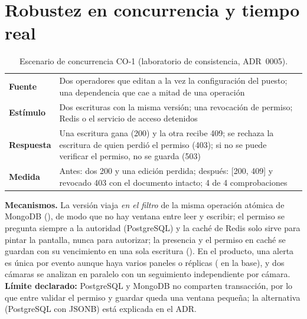 \section{Robustez en concurrencia y tiempo real}\label{sec:concurrencia}

\begin{table}[H]
\centering\small
\caption{Escenario de concurrencia CO-1 (laboratorio de consistencia, ADR~0005).}\label{tab:co1}
\begin{tabularx}{\textwidth}{lY}
\toprule
\textbf{Fuente} & Dos operadores que editan a la vez la configuración del puesto; una dependencia que cae a mitad de una operación \\
\textbf{Estímulo} & Dos escrituras con la misma versión; una revocación de permiso; Redis o el servicio de acceso detenidos \\
\textbf{Respuesta} & Una escritura gana (200) y la otra recibe 409; se rechaza la escritura de quien perdió el permiso (403); si no se puede verificar el permiso, no se guarda (503) \\
\textbf{Medida} & Antes: dos 200 y una edición perdida; después: [200, 409] y revocado 403 con el documento intacto; 4 de 4 comprobaciones \\
\bottomrule
\end{tabularx}
\end{table}

\textbf{Mecanismos.} La versión viaja \emph{en el filtro} de la misma operación atómica de MongoDB (), de modo que no hay
ventana entre leer y escribir; el permiso se pregunta siempre a la autoridad (PostgreSQL) y la caché de Redis solo sirve para pintar la
pantalla, nunca para autorizar; la presencia y el permiso en caché se guardan con su vencimiento en una sola escritura ().
En el producto, una alerta es única por evento aunque haya varios paneles o réplicas ( en la base), y dos cámaras se analizan en
paralelo con un seguimiento independiente por cámara. \textbf{Límite declarado:} PostgreSQL y MongoDB no comparten transacción, por lo que
entre validar el permiso y guardar queda una ventana pequeña; la alternativa (PostgreSQL con JSONB) está explicada en el ADR.
